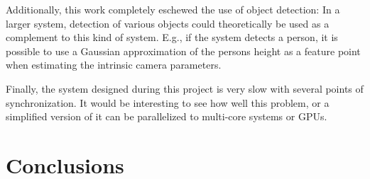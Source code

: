 \documentclass[preprint,acmtog]{acmart}
\begin{document}
Additionally, this work completely eschewed the use of object detection: In a
larger system, detection of various objects could theoretically be used as a
complement to this kind of system. E.g., if the system detects a person, it is
possible to use a Gaussian approximation of the persons height as a feature
point when estimating the intrinsic camera parameters.

Finally, the system designed during this project is very slow with several
points of synchronization. It would be interesting to see how well this problem,
or a simplified version of it can be parallelized to multi-core systems or GPUs.


\section{Conclusions}



\begin{acks}
\end{acks}



\end{document}
